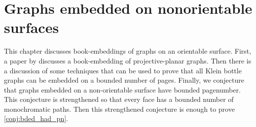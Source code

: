 \chapter{Graphs embedded on nonorientable surfaces}\label{chap:nonorientable}

This chapter discusses book-embeddings of graphs on an orientable surface. First, a paper by \textcite{nakamotoBookEmbeddingProjectiveplanar2015} discusses a book-embedding of projective-planar graphs. Then there is a discussion of some techniques that can be used to prove that all Klein bottle graphs can be embedded on a bounded number of pages. Finally, we conjecture that graphs embedded on a non-orientable surface have bounded pagenumber. This conjecture is strengthened so that every face has a bounded number of monochromatic paths. Then this strengthened conjecture is enough to prove \cref{conj:bded_had_pn}.






